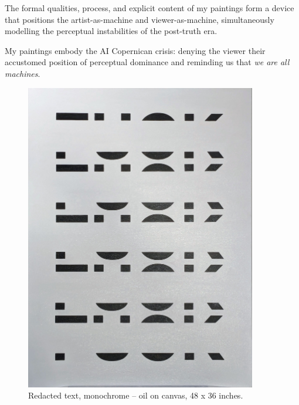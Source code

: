 \documentclass[12pt]{article}
\begin{document}
The formal qualities, process, and explicit content of my paintings
form a device that positions the artist-as-machine and viewer-as-machine,
simultaneously modelling the perceptual instabilities of the
post-truth era.

My paintings embody the AI Copernican crisis:
denying the viewer their accustomed position of perceptual dominance
and reminding us that \emph{we are all machines}.

\newpage
\begin{figure}[htbp]
  \centering
  \includegraphics*[width=0.9\textwidth]{figures/black.jpg}
  \caption{Redacted text, monochrome -- oil on canvas, 48 x 36 inches.}
  \label{fig:black}
\end{figure}
\end{document}
